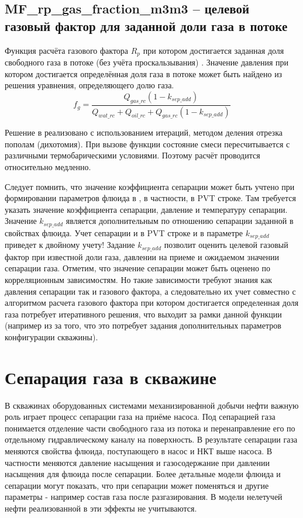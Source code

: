 


\subsection{MF\_rp\_gas\_fraction\_m3m3 – целевой газовый фактор для заданной доли газа в потоке}
Функция расчёта газового фактора $R_p$ при котором достигается заданная доля свободного газа в потоке (без учёта проскальзывания) . 
Значение давления при котором достигается определённая доля газа в потоке может быть найдено из решения уравнения, определяющего долю газа. 
$$f_g = \frac{Q_{gas\_rc} (1-k_{sep\_add})}{Q_{wat\_rc}+Q_{oil\_rc}+Q_{gas\_rc}(1-k_{sep\_add})} $$

Решение в \unf{} реализовано с использованием итераций, методом деления отрезка пополам (дихотомия). При вызове функции  состояние смеси пересчитывается с различными термобарическими условиями. Поэтому расчёт проводится относительно медленно. 

Следует помнить, что значение коэффициента сепарации может быть учтено при формировании параметров флюида в \unf{}, в частности, в PVT строке. Там требуется указать значение коэффициента сепарации, давление и температуру сепарации. Значение $k_{sep\_add}$ является дополнительным по отношению сепарации заданной в свойствах флюида. Учет сепарации и в PVT строке и в параметре $k_{sep\_add}$ приведет к двойному учету!
Задание $k_{sep\_add}$ позволит оценить целевой газовый фактор при известной доли газа, давлении на приеме и ожидаемом значении сепарации газа. Отметим, что значение сепарации может быть оценено по корреляционным зависимостям. Но такие зависимости требуют знания как давления сепарации так и газового фактора, а следовательно их учет совместно с алгоритмом расчета газового фактора при котором достигается определенная доля газа потребует итеративного решения, что выходит за рамки данной функции (например из за того, что это потребует задания дополнительных параметров конфигурации скважины).


\section{Сепарация газа в скважине}
В скважинах оборудованных системами механизированной добычи нефти важную роль играет процесс сепарации газа на приёме насоса. Под сепарацией газа понимается отделение части свободного газа из потока и перенаправление его по отдельному гидравлическому каналу на поверхность. В результате сепарации газа меняются свойства флюида, поступающего в насос и НКТ выше насоса. В частности меняются давление насыщения и газосодержание при давлении насыщения для флюида после сепарации. Более детальные модели флюида и сепарации могут показать, что при сепарации может поменяться и другие параметры - например состав газа после разгазирования. В модели нелетучей нефти реализованной в \unf{} эти эффекты не учитываются.


